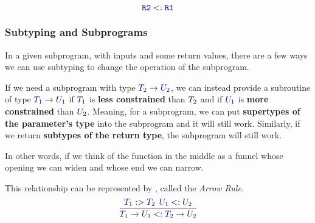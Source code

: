 \begin{equation*}
  \mathtt{\SemanticType{R2}} <: \mathtt{\SemanticType{R1}}
\end{equation*}

\subsubsection{Subtyping and Subprograms}\label{subsubsec:Subtyping_and_Subprograms}
In a given subprogram, with  inputs and some return values, there are a few ways we can use subtyping to change the operation of the subprogram.

If we need a subprogram with type $\SemanticType{T_{2}} \rightarrow \SemanticType{U_{2}}$, we can instead provide a subroutine of type $\SemanticType{T_{1}} \rightarrow \SemanticType{U_{1}}$ if $\SemanticType{T_1}$ is \textbf{less constrained} than $\SemanticType{T_{2}}$ and if $\SemanticType{U_{1}}$ is \textbf{more constrained} than $\SemanticType{U_{2}}$.
Meaning, for a subprogram, we can put \textbf{supertypes of the parameter's type} into the subprogram and it will still work.
Similarly, if we return \textbf{subtypes of the return type}, the subprogram will still work.

In other words, if we think of the function in the middle as a funnel whose opening we can widen and whose end we can narrow.

This relationship can be represented by , called the \emph{Arrow Rule}.
\begin{equation}\label{eq:Arrow_Rule}
  \dfrac{\SemanticType{T_{1}} :> \SemanticType{T_{2}} \:\: \SemanticType{U_{1}} <: \SemanticType{U_{2}}}{\SemanticType{T_{1}} \rightarrow \SemanticType{U_{1}} <: \SemanticType{T_{2}} \rightarrow \SemanticType{U_{2}}}
\end{equation}



